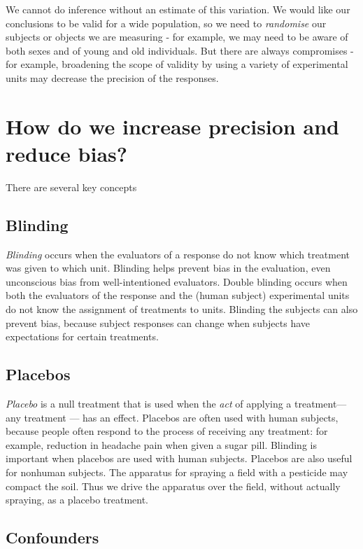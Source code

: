 \documentclass[
]{book}
\begin{document}
We cannot do inference without an estimate of this variation. We would like our conclusions to be valid for a wide population, so we need to \emph{randomise} our subjects or objects we are measuring - for example, we may need to be aware of both sexes and of young and old individuals. But there are always compromises - for example, broadening the scope of validity by using a variety of experimental units may decrease the precision of the responses.

\section{How do we increase precision and reduce bias?}\label{how-do-we-increase-precision-and-reduce-bias}

There are several key concepts

\subsection{Blinding}\label{blinding}

\emph{Blinding} occurs when the evaluators of a response do not know which treatment was given to which unit. Blinding helps prevent bias in the evaluation, even unconscious bias from well-intentioned evaluators. Double blinding occurs when both the evaluators of the response and the (human subject) experimental units do not know the assignment of treatments to units. Blinding the subjects can also prevent bias, because subject responses can change when subjects have expectations for certain treatments.

\subsection{Placebos}\label{placebos}

\emph{Placebo} is a null treatment that is used when the \emph{act} of applying a treatment--- any treatment --- has an effect. Placebos are often used with human subjects, because people often respond to the process of receiving any treatment: for example, reduction in headache pain when given a sugar pill. Blinding is important when placebos are used with human subjects. Placebos are also useful for nonhuman subjects. The apparatus for spraying a field with a pesticide may compact the soil. Thus we drive the apparatus over the field, without actually spraying, as a placebo treatment.

\subsection{Confounders}\label{confounders}
\end{document}

